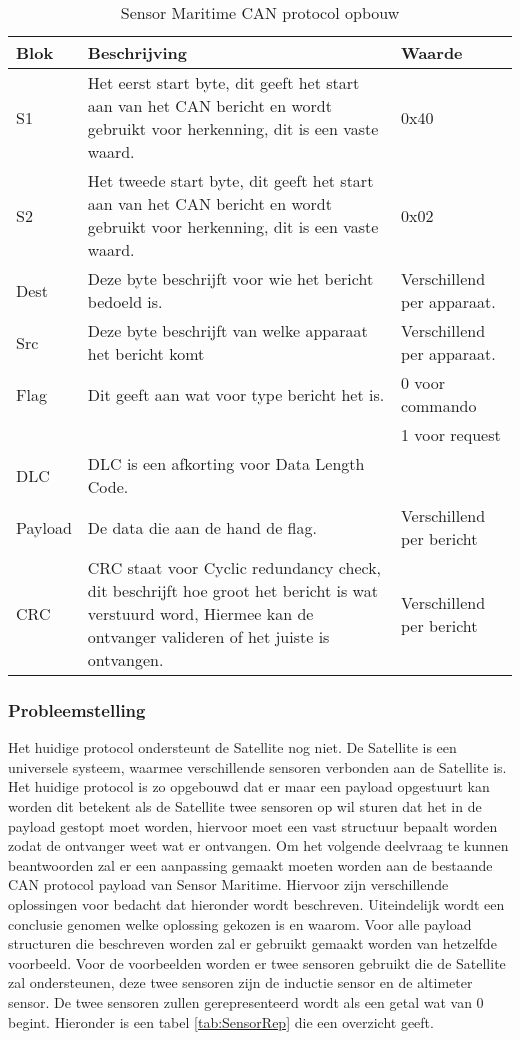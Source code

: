 \begin{table}[h!]
	\caption{Sensor Maritime CAN protocol opbouw}
	\label{tab:cansensorprotocol}
	\begin{tabular}{p{1.5cm}p{10.5cm}p{3cm}}
	\toprule
	\textbf{Blok} & \textbf{Beschrijving} & \textbf{Waarde}\\ \midrule
	S1		& Het eerst start byte, dit geeft het start aan van het CAN bericht en wordt gebruikt voor herkenning, dit is een vaste waard.	& 0x40 \\
	S2		& Het tweede start byte, dit geeft het start aan van het CAN bericht en wordt gebruikt voor herkenning, dit is een vaste waard. & 0x02 \\
	Dest	& Deze byte beschrijft voor wie het bericht bedoeld is.		& Verschillend per apparaat. \\
	Src		& Deze byte beschrijft van welke apparaat het bericht komt	& Verschillend per apparaat.\\ 
	Flag	& Dit geeft aan wat voor type bericht het is.             & 0 voor commando \\ 
			& & 1 voor request \\ 
	DLC		& DLC is een afkorting voor Data Length Code.             & \\ 
	Payload	& De data die aan de hand de flag. & Verschillend per bericht\\
	CRC		& CRC staat voor Cyclic redundancy check, dit beschrijft hoe groot het bericht is wat verstuurd word, Hiermee kan de ontvanger valideren of het juiste is ontvangen. & Verschillend per bericht\\ \bottomrule
	\end{tabular}
\end{table}

\subsubsection{Probleemstelling}
Het huidige protocol ondersteunt de Satellite nog niet. De Satellite is een universele systeem, waarmee verschillende sensoren verbonden aan de Satellite is. Het huidige protocol is zo opgebouwd dat er maar een payload opgestuurt kan worden dit betekent als de Satellite twee sensoren op wil sturen dat het in de payload gestopt moet worden, hiervoor moet een vast structuur bepaalt worden zodat de ontvanger weet wat er ontvangen. Om het volgende deelvraag te kunnen beantwoorden zal er een aanpassing gemaakt moeten worden aan de bestaande CAN protocol payload van Sensor Maritime. Hiervoor zijn verschillende oplossingen voor bedacht dat hieronder wordt beschreven. Uiteindelijk wordt een conclusie genomen welke oplossing gekozen is en waarom. Voor alle payload structuren die beschreven worden zal er gebruikt gemaakt worden van hetzelfde voorbeeld. Voor de voorbeelden worden er twee sensoren gebruikt die de Satellite zal ondersteunen, deze twee sensoren zijn de inductie sensor en de altimeter sensor. De twee sensoren zullen gerepresenteerd wordt als een getal wat van 0 begint. Hieronder is een tabel \ref{tab:SensorRep} die een overzicht geeft.

